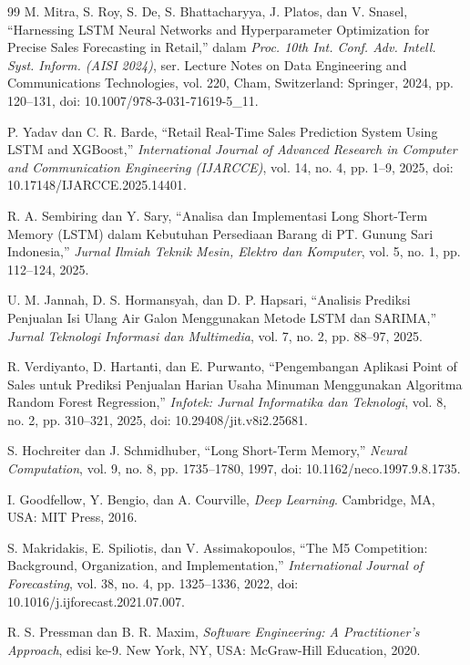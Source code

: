 \documentclass[10pt,a4paper]{article}
\begin{document}
\begin{thebibliography}{99}
M. Mitra, S. Roy, S. De, S. Bhattacharyya, J. Platos, dan V. Snasel, ``Harnessing LSTM Neural Networks and Hyperparameter Optimization for Precise Sales Forecasting in Retail,'' dalam \textit{Proc. 10th Int. Conf. Adv. Intell. Syst. Inform. (AISI 2024)}, ser. Lecture Notes on Data Engineering and Communications Technologies, vol. 220, Cham, Switzerland: Springer, 2024, pp. 120--131, doi: 10.1007/978-3-031-71619-5\_11.

P. Yadav dan C. R. Barde, ``Retail Real-Time Sales Prediction System Using LSTM and XGBoost,'' \textit{International Journal of Advanced Research in Computer and Communication Engineering (IJARCCE)}, vol. 14, no. 4, pp. 1--9, 2025, doi: 10.17148/IJARCCE.2025.14401.

R. A. Sembiring dan Y. Sary, ``Analisa dan Implementasi Long Short-Term Memory (LSTM) dalam Kebutuhan Persediaan Barang di PT. Gunung Sari Indonesia,'' \textit{Jurnal Ilmiah Teknik Mesin, Elektro dan Komputer}, vol. 5, no. 1, pp. 112--124, 2025.

U. M. Jannah, D. S. Hormansyah, dan D. P. Hapsari, ``Analisis Prediksi Penjualan Isi Ulang Air Galon Menggunakan Metode LSTM dan SARIMA,'' \textit{Jurnal Teknologi Informasi dan Multimedia}, vol. 7, no. 2, pp. 88--97, 2025.

R. Verdiyanto, D. Hartanti, dan E. Purwanto, ``Pengembangan Aplikasi Point of Sales untuk Prediksi Penjualan Harian Usaha Minuman Menggunakan Algoritma Random Forest Regression,'' \textit{Infotek: Jurnal Informatika dan Teknologi}, vol. 8, no. 2, pp. 310--321, 2025, doi: 10.29408/jit.v8i2.25681.

S. Hochreiter dan J. Schmidhuber, ``Long Short-Term Memory,'' \textit{Neural Computation}, vol. 9, no. 8, pp. 1735--1780, 1997, doi: 10.1162/neco.1997.9.8.1735.

I. Goodfellow, Y. Bengio, dan A. Courville, \textit{Deep Learning}. Cambridge, MA, USA: MIT Press, 2016.

S. Makridakis, E. Spiliotis, dan V. Assimakopoulos, ``The M5 Competition: Background, Organization, and Implementation,'' \textit{International Journal of Forecasting}, vol. 38, no. 4, pp. 1325--1336, 2022, doi: 10.1016/j.ijforecast.2021.07.007.

R. S. Pressman dan B. R. Maxim, \textit{Software Engineering: A Practitioner's Approach}, edisi ke-9. New York, NY, USA: McGraw-Hill Education, 2020.


\end{thebibliography}
\end{document}

